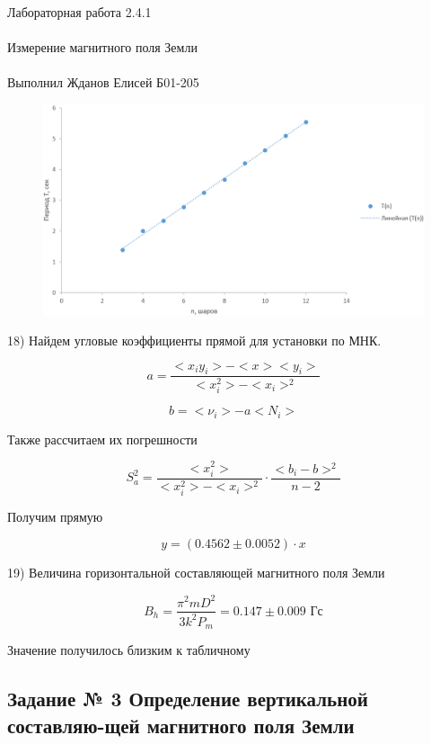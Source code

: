 \documentclass{astroedu-lab}
\begin{document}
\begin{problem}{\huge Лабораторная работа 2.4.1\\\\Измерение магнитного поля Земли\\\\Выполнил Жданов Елисей Б01-205}
\begin{figure}[!h]
	\centering
	\includegraphics[width=1\textwidth]{график1.png}
	\label{fig:boiler}
\end{figure}

18) Найдем угловые коэффициенты прямой для установки по МНК.

\[
	a = \frac{<x_i y_i> - < x > < y_i >}{< x_i^2> - < x_i >^2}
\]

\[
	b = < \nu_i > - a < N_i >
\]

Также рассчитаем их погрешности

\begin{equation}
	S_a^2 = \frac{< x_i^2>}{< x_i^2 > - < x_i >^2} \cdot \frac{<  b_i - b > ^2}{n - 2}
\end{equation}

Получим прямую

\begin{equation}
	y = (0.4562 \pm 0.0052) \cdot x
\end{equation}

19) Величина горизонтальной составляющей магнитного поля Земли

\begin{equation}
	B_h = \frac{\pi ^ 2 m D^2 }{3 k^2 P_m} = 0.147 \pm 0.009 \text{ Гс}
\end{equation}

Значение получилось близким к табличному

\subsection{Задание № 3 Определение вертикальной составляю-щей магнитного поля Земли}


\end{problem}
\end{document}
